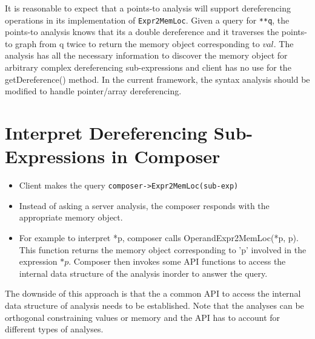 \documentclass{article}
\begin{document}
It is reasonable to expect that a points-to analysis will support dereferencing operations in its implementation of \texttt{Expr2MemLoc}. Given a query for \texttt{**q}, the points-to analysis knows that its a double dereference and it traverses the points-to graph from q twice to return the memory object corresponding to $val$. The analysis has all the necessary information to discover the memory object for arbitrary complex dereferencing sub-expressions and client has no use for the getDereference() method. In the current framework, the syntax analysis should be modified to handle pointer/array dereferencing.

\section{Interpret Dereferencing Sub-Expressions in Composer}
\label{sec:interp-deref-exp-composer}
\begin{itemize}
\item Client makes the query \texttt{composer->Expr2MemLoc(sub-exp)}
\item Instead of asking a server analysis, the composer responds with the appropriate memory object.
\item For example to interpret *p, composer calls OperandExpr2MemLoc(*p, p). This function returns the memory object corresponding to 'p' involved in the expression $*p$. Composer then invokes some API functions to access the internal data structure of the analysis inorder to answer the query.
\end{itemize}
The downside of this approach is that the a common API to access the internal data structure of analysis needs to be established. Note that the analyses can be orthogonal constraining values or memory and the API has to account for different types of analyses.
\end{document}
